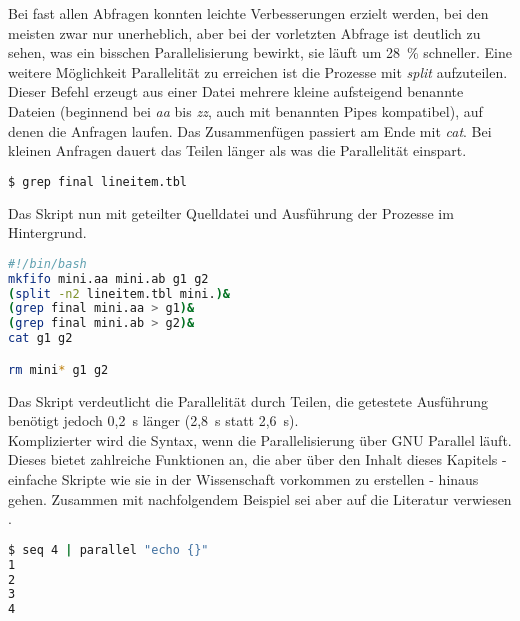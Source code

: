 
Bei fast allen Abfragen konnten leichte Verbesserungen erzielt werden, bei den meisten zwar nur unerheblich, aber bei der vorletzten Abfrage ist deutlich zu sehen, was ein bisschen Parallelisierung bewirkt, sie läuft um 28\ \% schneller.
Eine weitere Möglichkeit Parallelität zu erreichen ist die Prozesse mit \textit{split} aufzuteilen. Dieser Befehl erzeugt aus einer Datei mehrere kleine aufsteigend benannte Dateien (beginnend bei \textit{aa} bis \textit{zz}, auch mit benannten Pipes kompatibel), auf denen die Anfragen laufen. Das Zusammenfügen passiert am Ende mit \textit{cat}. Bei kleinen Anfragen dauert das Teilen länger als was die Parallelität einspart.

\begin{lstlisting}[language=Bash]
$ grep final lineitem.tbl
\end{lstlisting}
Das Skript nun mit geteilter Quelldatei und Ausführung der Prozesse im Hintergrund.
\begin{lstlisting}[language=Bash]
#!/bin/bash
mkfifo mini.aa mini.ab g1 g2
(split -n2 lineitem.tbl mini.)&
(grep final mini.aa > g1)&
(grep final mini.ab > g2)&
cat g1 g2

rm mini* g1 g2
\end{lstlisting}
Das Skript verdeutlicht die Parallelität durch Teilen, die getestete Ausführung benötigt jedoch 0,2\ s länger (2,8\ s statt 2,6\ s).\\

Komplizierter wird die Syntax, wenn die Parallelisierung über GNU Parallel läuft. Dieses bietet zahlreiche Funktionen an, die aber über den Inhalt dieses Kapitels - einfache Skripte wie sie in der Wissenschaft vorkommen zu erstellen - hinaus gehen. Zusammen mit nachfolgendem Beispiel sei aber auf die Literatur verwiesen \cite{DataScience}.
\begin{lstlisting}[language=Bash]
$ seq 4 | parallel "echo {}"
1
2
3
4
\end{lstlisting}
